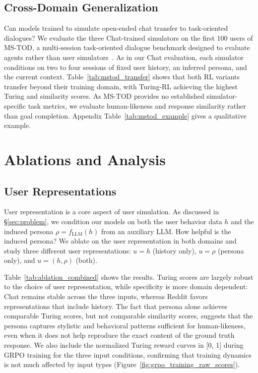\documentclass[11pt]{article}
\begin{document}
\subsection{Cross-Domain Generalization}
Can models trained to simulate open-ended chat transfer to task-oriented dialogues? We evaluate the three Chat-trained simulators on the first 100 users of MS-TOD, a multi-session task-oriented dialogue benchmark designed to evaluate agents rather than user simulators~\citep{du2026memguide}. As in our Chat evaluation, each simulator conditions on two to four sessions of fixed user history, an inferred persona, and the current context. Table~\ref{tab:mstod_transfer} shows that both RL variants transfer beyond their training domain, with Turing-RL achieving the highest Turing and similarity scores. As MS-TOD provides no established simulator-specific task metrics, we evaluate human-likeness and response similarity rather than goal completion. Appendix Table~\ref{tab:mstod_example} gives a qualitative example.
\section{Ablations and Analysis}
\subsection{User Representations}
User representation is a core aspect of user simulation. As discussed in \S\ref{sec:problem}, we condition our models on both the user behavior data $h$ and the induced persona $\rho = f_{\text{LLM}}(h)$ from an auxiliary LLM. How helpful is the induced persona? We ablate on the user representation in both domains and study three different user representations: $u = h$ (history only), $u = \rho$ (persona only), and $u = (h, \rho)$ (both).

Table~\ref{tab:ablation_combined} shows the results. Turing scores are largely robust to the choice of user representation, while specificity is more domain dependent: Chat remains stable across the three inputs, whereas Reddit favors representations that include history. The fact that persona alone achieves comparable Turing scores, but not comparable similarity scores, suggests that the persona captures stylistic and behavioral patterns sufficient for human-likeness, even when it does not help reproduce the exact content of the ground truth response. We also include the normalized Turing reward curves in [0, 1] during GRPO training for the three input conditions, confirming that training dynamics is not much affected by input types (Figure~\ref{fig:grpo_training_raw_scores}).
\end{document}
